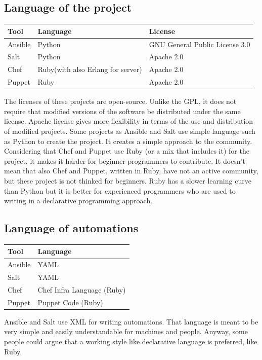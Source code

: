 \documentclass[12pt,a4paper,openright,twoside]{book}
\begin{document}
\subsection{Language of the project}
\begin{table}[H]
    \begin{tabular}{|l|l|l|}
    \hline
    \textbf{Tool} & \textbf{Language}                   & \textbf{License}                                 \\ \hline
    Ansible       & Python                              & GNU General Public License 3.0                   \\ \hline
    Salt          & Python                              & Apache 2.0                                       \\ \hline
    Chef          & Ruby(with also Erlang for server)   & Apache 2.0                                       \\ \hline
    Puppet        & Ruby                                & Apache 2.0                                       \\ \hline
    \end{tabular}
\end{table}

The licenses of these projects are open-source. Unlike the GPL, it does not require that modified versions of the software be distributed under the same license. Apache license gives more flexibility in terms of the use and distribution of modified projects.
Some projects as Ansible and Salt use simple language such as Python to create the project. It creates a simple approach to the community.
Considering that Chef and Puppet use Ruby (or a mix that includes it) for the project, it makes it harder for beginner programmers to contribute.
It doesn't mean that also Chef and Puppet, written in Ruby, have not an active community, but these project is not thinked for beginners.
Ruby has a slower learning curve than Python but it is better for experienced programmers who are used to writing in a declarative programming approach.

\subsection{Language of automations}
\begin{table}[H]
    \begin{tabular}{|l|l|}
    \hline
    \textbf{Tool} & \textbf{Language}                 \\ \hline
    Ansible       & YAML                              \\ \hline
    Salt          & YAML                              \\ \hline
    Chef          & Chef Infra Language (Ruby)         \\ \hline
    Puppet        & Puppet Code (Ruby)                \\ \hline
    \end{tabular}
\end{table}
Ansible and Salt use XML for writing automations. That language is meant to be very simple and easily understandable for machines and people.
Anyway, some people could argue that a working style like declarative language is preferred, like Ruby.
\end{document}
